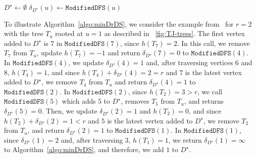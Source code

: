 \documentclass[a4paper]{article}
\theoremstyle{plain}
\theoremstyle{definition}
\begin{document}
\begin{algorithm}[ht]
	\DontPrintSemicolon
	
	$D^\star \gets \emptyset$\;
	$\delta_{D^\star}(u) \gets \mathtt{ModifiedDFS}(u)$\;
	
	\BlankLine
	
	
	
	\caption{$\mathtt{MinDrDSTree}(T_u)$}
	\label{algo:minDrDS}
\end{algorithm}

To illustrate Algorithm~\ref{algo:minDrDS}, we consider the example from~\cite{Abu-AffashCK22} for $r = 2$ with the tree $T_u$ rooted at $u = 1$ as described in \figurename~\ref{fig:TJ-trees}.
The first vertex added to $D^\star$ is $7$ in $\mathtt{ModifiedDFS}(7)$, since $h(T_7) = 2$.
In this call, we remove $T_7$ from $T_u$, update $h(T_7) = -1$ and return $\delta_{D^\star}(7) = 0$ to $\mathtt{ModifiedDFS}(4)$.
In $\mathtt{ModifiedDFS}(4)$, we update $\delta_{D^\star}(4) = 1$ and, after traversing vertices $6$ and $8$, $h(T_4) = 1$, and since $h(T_4) + \delta_{D^\star}(4) = 2 = r$ and $7$ is the latest vertex added to $D^\star$, we remove $T_4$ from $T_u$ and return $\delta_{D^\star}(4) = 1$ to $\mathtt{ModifiedDFS}(2)$.
In $\mathtt{ModifiedDFS}(2)$, since $h(T_2) = 3 > r$, we call $\mathtt{ModifiedDFS}(5)$ which adds $5$ to $D^\star$, removes $T_5$ from $T_u$, and returns $\delta_{D^\star}(5) = 0$.
Then, we update $\delta_{D^\star}(2) = 1$ and $h(T_2) = 0$, and since $h(T_2) + \delta_{D^\star}(2) = 1 < r$ and $5$ is the latest vertex added to $D^\star$, we remove $T_2$ from $T_u$, and return $\delta_{D^\star}(2) = 1$ to $\mathtt{ModifiedDFS}(1)$.
In $\mathtt{ModifiedDFS}(1)$, since $\delta_{D^\star}(1) = 2$ and, after traversing $3$, $h(T_1) = 1$, we return $\delta_{D^\star}(1) = \infty$ to Algorithm~\ref{algo:minDrDS}, and therefore, we add $1$ to $D^\star$.
\end{document}
